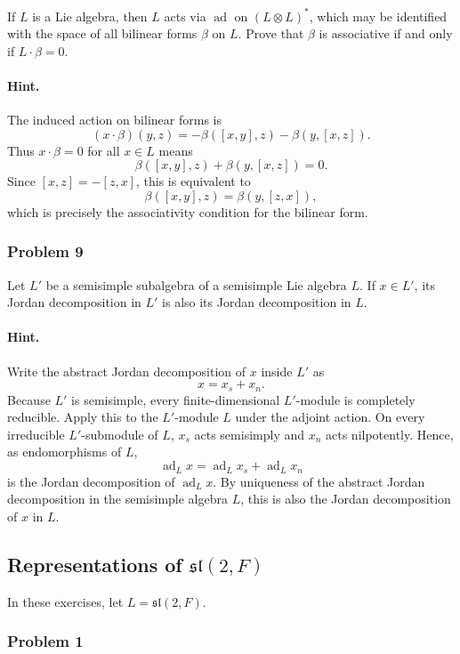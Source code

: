 \documentclass[12pt, a4paper]{article}
\begin{document}
If \(L\) is a Lie algebra, then \(L\) acts via \(\operatorname{ad}\) on
\((L\otimes L)^*\), which may be identified with the space of all bilinear
forms \(\beta\) on \(L\). Prove that \(\beta\) is associative if and only if
\(L\cdot \beta=0\).

\paragraph{Hint.}
The induced action on bilinear forms is
\[
(x\cdot \beta)(y,z)
=
-\beta([x,y],z)-\beta(y,[x,z]).
\]
Thus \(x\cdot\beta=0\) for all \(x\in L\) means
\[
\beta([x,y],z)+\beta(y,[x,z])=0.
\]
Since \([x,z]=-[z,x]\), this is equivalent to
\[
\beta([x,y],z)=\beta(y,[z,x]),
\]
which is precisely the associativity condition for the bilinear form.

\subsubsection{Problem 9}

Let \(L'\) be a semisimple subalgebra of a semisimple Lie algebra \(L\). If
\(x\in L'\), its Jordan decomposition in \(L'\) is also its Jordan decomposition
in \(L\).

\paragraph{Hint.}
Write the abstract Jordan decomposition of \(x\) inside \(L'\) as
\[
x=x_s+x_n.
\]
Because \(L'\) is semisimple, every finite-dimensional \(L'\)-module is
completely reducible. Apply this to the \(L'\)-module \(L\) under the adjoint
action. On every irreducible \(L'\)-submodule of \(L\), \(x_s\) acts
semisimply and \(x_n\) acts nilpotently. Hence, as endomorphisms of \(L\),
\[
\operatorname{ad}_L x
=
\operatorname{ad}_L x_s+\operatorname{ad}_L x_n
\]
is the Jordan decomposition of \(\operatorname{ad}_L x\). By uniqueness of the
abstract Jordan decomposition in the semisimple algebra \(L\), this is also the
Jordan decomposition of \(x\) in \(L\).

\subsection{Representations of \(\mathfrak{sl}(2,F)\)}

In these exercises, let \(L=\mathfrak{sl}(2,F)\).

\subsubsection{Problem 1}
\end{document}
